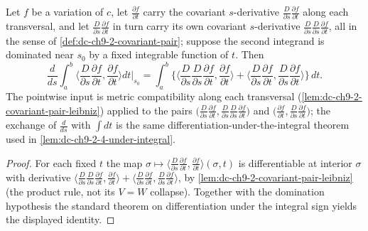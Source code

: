 \begin{lemma}
  \label{lem:dc-ch9-2-8-under-integral}
  \leanok
  Let $f$ be a variation of $c$, let $\frac{\partial f}{\partial t}$ carry the covariant
  $s$-derivative $\frac{D}{\partial s}\frac{\partial f}{\partial t}$ along each transversal,
  and let $\frac{D}{\partial s}\frac{\partial f}{\partial t}$ in turn carry its own covariant
  $s$-derivative $\frac{D}{\partial s}\frac{D}{\partial s}\frac{\partial f}{\partial t}$, all
  in the sense of \cref{def:dc-ch9-2-covariant-pair}; suppose the second integrand is
  dominated near $s_0$ by a fixed integrable function of $t$. Then
  $$
  \frac{d}{ds}\int_a^b\Big\langle\frac{D}{\partial s}\frac{\partial f}{\partial t},
    \frac{\partial f}{\partial t}\Big\rangle dt\Big|_{s_0}
  = \int_a^b\Big\{\Big\langle\frac{D}{\partial s}\frac{D}{\partial s}\frac{\partial f}{\partial t},
    \frac{\partial f}{\partial t}\Big\rangle
    + \Big\langle\frac{D}{\partial s}\frac{\partial f}{\partial t},
      \frac{D}{\partial s}\frac{\partial f}{\partial t}\Big\rangle\Big\}\,dt .
  $$
  The pointwise input is metric compatibility along each transversal
  (\cref{lem:dc-ch9-2-covariant-pair-leibniz}) applied to the pairs
  $\big(\frac{D}{\partial s}\frac{\partial f}{\partial t},
    \frac{D}{\partial s}\frac{D}{\partial s}\frac{\partial f}{\partial t}\big)$ and
  $\big(\frac{\partial f}{\partial t},\frac{D}{\partial s}\frac{\partial f}{\partial t}\big)$;
  the exchange of $\frac{d}{ds}$ with $\int dt$ is the same differentiation-under-the-integral
  theorem used in \cref{lem:dc-ch9-2-4-under-integral}.
\end{lemma}
\begin{proof}
  \leanok
  \sketch
  For each fixed $t$ the map
  $\sigma\mapsto\langle\frac{D}{\partial s}\frac{\partial f}{\partial t},\frac{\partial f}{\partial t}\rangle(\sigma,t)$
  is differentiable at interior $\sigma$ with derivative
  $\langle\frac{D}{\partial s}\frac{D}{\partial s}\frac{\partial f}{\partial t},\frac{\partial f}{\partial t}\rangle
  +\langle\frac{D}{\partial s}\frac{\partial f}{\partial t},\frac{D}{\partial s}\frac{\partial f}{\partial t}\rangle$,
  by \cref{lem:dc-ch9-2-covariant-pair-leibniz} (the product rule, not its $V=W$ collapse).
  Together with the domination hypothesis the standard theorem on differentiation under the
  integral sign yields the displayed identity.
\end{proof}
